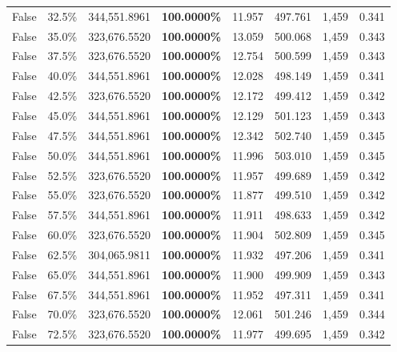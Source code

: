 \begin{table}[H]
\begin{tabular}{lllrllll}
\cline{1-8}
False & 32.5\% & 344,551.8961 & \bfseries \color{red} 100.0000\% & 11.957 & 497.761 & 1,459 & 0.341 \\
\cline{1-8}
False & 35.0\% & 323,676.5520 & \bfseries \color{red} 100.0000\% & 13.059 & 500.068 & 1,459 & 0.343 \\
\cline{1-8}
False & 37.5\% & 323,676.5520 & \bfseries \color{red} 100.0000\% & 12.754 & 500.599 & 1,459 & 0.343 \\
\cline{1-8}
False & 40.0\% & 344,551.8961 & \bfseries \color{red} 100.0000\% & 12.028 & 498.149 & 1,459 & 0.341 \\
\cline{1-8}
False & 42.5\% & 323,676.5520 & \bfseries \color{red} 100.0000\% & 12.172 & 499.412 & 1,459 & 0.342 \\
\cline{1-8}
False & 45.0\% & 344,551.8961 & \bfseries \color{red} 100.0000\% & 12.129 & 501.123 & 1,459 & 0.343 \\
\cline{1-8}
False & 47.5\% & 344,551.8961 & \bfseries \color{red} 100.0000\% & 12.342 & 502.740 & 1,459 & 0.345 \\
\cline{1-8}
False & 50.0\% & 344,551.8961 & \bfseries \color{red} 100.0000\% & 11.996 & 503.010 & 1,459 & 0.345 \\
\cline{1-8}
False & 52.5\% & 323,676.5520 & \bfseries \color{red} 100.0000\% & 11.957 & 499.689 & 1,459 & 0.342 \\
\cline{1-8}
False & 55.0\% & 323,676.5520 & \bfseries \color{red} 100.0000\% & 11.877 & 499.510 & 1,459 & 0.342 \\
\cline{1-8}
False & 57.5\% & 344,551.8961 & \bfseries \color{red} 100.0000\% & 11.911 & 498.633 & 1,459 & 0.342 \\
\cline{1-8}
False & 60.0\% & 323,676.5520 & \bfseries \color{red} 100.0000\% & 11.904 & 502.809 & 1,459 & 0.345 \\
\cline{1-8}
False & 62.5\% & \color{red} 304,065.9811 & \bfseries \color{red} 100.0000\% & 11.932 & 497.206 & 1,459 & 0.341 \\
\cline{1-8}
False & 65.0\% & 344,551.8961 & \bfseries \color{red} 100.0000\% & 11.900 & 499.909 & 1,459 & 0.343 \\
\cline{1-8}
False & 67.5\% & 344,551.8961 & \bfseries \color{red} 100.0000\% & 11.952 & 497.311 & 1,459 & 0.341 \\
\cline{1-8}
False & 70.0\% & 323,676.5520 & \bfseries \color{red} 100.0000\% & 12.061 & 501.246 & 1,459 & 0.344 \\
\cline{1-8}
False & 72.5\% & 323,676.5520 & \bfseries \color{red} 100.0000\% & 11.977 & 499.695 & 1,459 & 0.342 \\

\end{tabular}
\end{table}
